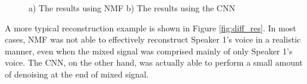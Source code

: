\documentclass[12pt,chapterheads]{ucsd}
\begin{document}
\begin{figure}[h]
    \begin{minipage}{.5\linewidth}
        \centering
    \end{minipage}%
    \begin{minipage}{.5\linewidth}
        \centering
    \end{minipage}
    \caption{ a) The results using NMF b) The results using the CNN}
    \label{fig:sim_res}
\end{figure}

A more typical reconstruction example is shown in Figure \ref{fig:diff_res}. In most cases, NMF was not able to effectively reconstruct Speaker 1's voice in a realistic manner, even when the mixed signal was comprised mainly of only Speaker 1's voice. The CNN, on the other hand, was actually able to perform a small amount of denoising at the end of mixed signal.
\end{document}
